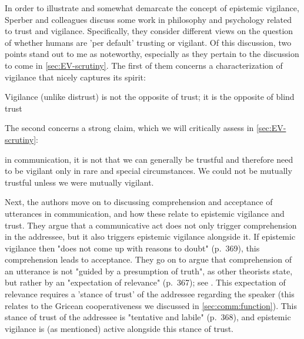 In order to illustrate and somewhat demarcate the concept of epistemic vigilance, Sperber and colleagues discuss some work in philosophy and psychology related to trust and vigilance. Specifically, they consider different views on the question of whether humans are 'per default' trusting or vigilant.
Of this discussion, two points stand out to me as noteworthy, especially as they pertain to the discussion to come in \cref{sec:EV-scrutiny}. The first of them concerns a characterization of vigilance that nicely captures its spirit:
\begin{quoting}
    Vigilance (unlike distrust) is not the opposite of trust; it is the opposite
of blind trust
    \hfill \citep[p.~363]{Sperber10}
\end{quoting}
The second concerns a strong claim, which we will critically assess in \cref{sec:EV-scrutiny}:
\begin{quoting}
    in communication, it is not that we can generally be trustful and therefore need to be vigilant only in rare and special circumstances. We could not be mutually trustful unless we were mutually vigilant.
    \hfill \citep[p.~364]{Sperber10}
\end{quoting}

Next, the authors move on to discussing comprehension and acceptance of utterances in communication, and how these relate to epistemic vigilance and trust.
They argue that a communicative act does not only trigger comprehension in the addressee, but it also triggers epistemic vigilance alongside it. If epistemic vigilance then "does not come up with reasons to doubt" (p.~369), this comprehension leads to acceptance.
They go on to argue that comprehension of an utterance is not "guided by a presumption of truth", as other theorists state, but rather by an "expectation of relevance" (p.~367); see \citet{SperberWilson86}. This expectation of relevance requires a 'stance of trust' of the addressee regarding the speaker (this relates to the Gricean cooperativeness we discussed in \cref{sec:comm:function}).
This stance of trust of the addressee is "tentative and labile" (p.~368), and epistemic vigilance is (as mentioned) active alongside this stance of trust.


